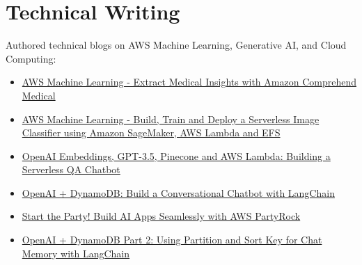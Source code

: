 \documentclass[11pt,a4paper]{article}
\begin{document}
\section*{Technical Writing}
Authored technical blogs on AWS Machine Learning, Generative AI, and Cloud Computing:
    \vspace{0.2em}
    \begin{itemize}[leftmargin=*,noitemsep,topsep=0pt]
        \item \href{https://www.antstack.com/blog/aws-machine-learning-extract-medical-insights-with-amazon-comprehend-medical/}{AWS Machine Learning - Extract Medical Insights with Amazon Comprehend Medical}
        \item \href{https://www.antstack.com/blog/aws-machine-learning-build-train-and-deploy-a-serverless-image-classifier-using-amazon-sage-maker-aws-lambda-and-efs/}{AWS Machine Learning - Build, Train and Deploy a Serverless Image Classifier using Amazon SageMaker, AWS Lambda and EFS}
        \item \href{https://www.antstack.com/blog/open-ai-embeddings-gpt-3-5-pinecone-and-aws-lambda-building-a-serverless-qa-chatbot/}{OpenAI Embeddings, GPT-3.5, Pinecone and AWS Lambda: Building a Serverless QA Chatbot}
        \item \href{https://www.antstack.com/blog/open-ai-dynamo-db-build-a-conversational-chatbot-with-langchain/}{OpenAI + DynamoDB: Build a Conversational Chatbot with LangChain}
        \item \href{https://www.antstack.com/blog/start-the-party-build-ai-apps-seamlessly-with-aws-party-rock/}{Start the Party! Build AI Apps Seamlessly with AWS PartyRock}
        \item \href{https://www.antstack.com/blog/open-ai-dynamo-db-part-2-using-partition-and-sort-key-for-chat-memory-with-langchain/}{OpenAI + DynamoDB Part 2: Using Partition and Sort Key for Chat Memory with LangChain}
    \end{itemize}
\end{document}
